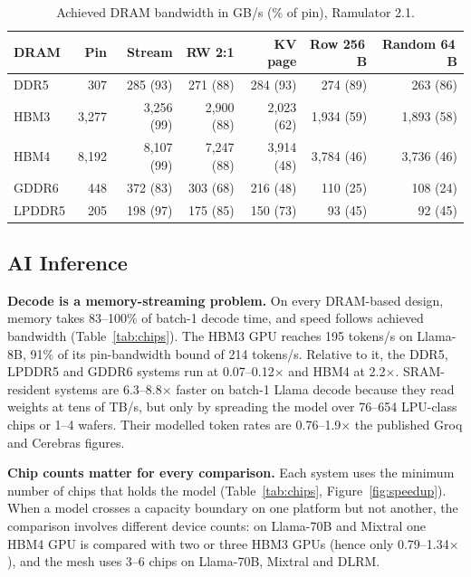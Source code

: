 \documentclass[12pt]{article}
\newcommand{\tmx}{\ensuremath{\times}}
\begin{document}
\begin{table}[htbp]
\centering
\caption{Achieved DRAM bandwidth in GB/s (\% of pin), Ramulator 2.1.}
\label{tab:calib}
\small
\begin{tabular}{@{}lrrrrrr@{}}
\toprule
DRAM & Pin & Stream & RW 2:1 & KV page & Row 256\,B & Random 64\,B\\
\midrule
DDR5 & 307 & 285 (93) & 271 (88) & 284 (93) & 274 (89) & 263 (86)\\
HBM3 & 3,277 & 3,256 (99) & 2,900 (88) & 2,023 (62) & 1,934 (59) & 1,893 (58)\\
HBM4 & 8,192 & 8,107 (99) & 7,247 (88) & 3,914 (48) & 3,784 (46) & 3,736 (46)\\
GDDR6 & 448 & 372 (83) & 303 (68) & 216 (48) & 110 (25) & 108 (24)\\
LPDDR5 & 205 & 198 (97) & 175 (85) & 150 (73) & 93 (45) & 92 (45)\\
\bottomrule
\end{tabular}
\end{table}



\subsection{AI Inference}
\textbf{Decode is a memory-streaming problem.} On every DRAM-based design, memory takes 83--100\% of batch-1 decode time, and speed follows achieved bandwidth (Table~\ref{tab:chips}). The HBM3 GPU reaches 195 tokens/s on Llama-8B, 91\% of its pin-bandwidth bound of 214 tokens/s. Relative to it, the DDR5, LPDDR5 and GDDR6 systems run at 0.07--0.12\tmx{} and HBM4 at 2.2\tmx. SRAM-resident systems are 6.3--8.8\tmx{} faster on batch-1 Llama decode because they read weights at tens of TB/s, but only by spreading the model over 76--654 LPU-class chips or 1--4 wafers. Their modelled token rates are 0.76--1.9\tmx{} the published Groq and Cerebras figures.



\textbf{Chip counts matter for every comparison.} Each system uses the minimum number of chips that holds the model (Table~\ref{tab:chips}, Figure~\ref{fig:speedup}). When a model crosses a capacity boundary on one platform but not another, the comparison involves different device counts: on Llama-70B and Mixtral one HBM4 GPU is compared with two or three HBM3 GPUs (hence only 0.79--1.34\tmx), and the mesh uses 3--6 chips on Llama-70B, Mixtral and DLRM.
\end{document}
